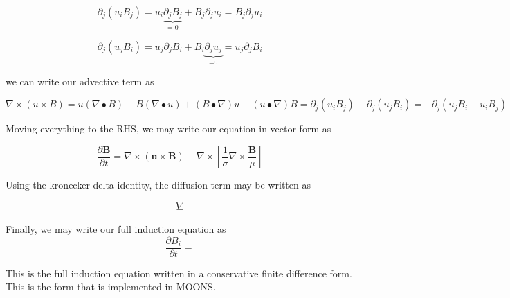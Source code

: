 \begin{equation}
\partial_j (u_i B_j) = 
u_i \underbrace{\partial_j B_j}_\text{= 0} + B_j \partial_j u_i
= B_j \partial_j u_i
\end{equation}

\begin{equation}
\partial_j (u_j B_i) = 
u_j \partial_j B_i + B_i \underbrace{\partial_j u_j}_\text{=0}
= u_j \partial_j B_i
\end{equation}

we can write our advective term as

\begin{equation}
\nabla \times (u \times B) 
= u(\nabla \bullet B) 
- B(\nabla \bullet u)
+ (B \bullet \nabla)u
- (u \bullet \nabla)B
=
\partial_j (u_i B_j) - \partial_j (u_j B_i)
=
-\partial_j (u_j B_i - u_i B_j)
\end{equation}

Moving everything to the RHS, we may write our equation in vector form as

\begin{equation}
\frac{\partial \pmb{B}}{\partial t} = 
\nabla \times (\pmb{u} \times \pmb{B})
- \nabla \times 
\left[ \frac{1}{\sigma}
\nabla \times \frac{\pmb{B}}{\mu} \right]
\end{equation}

Using the kronecker delta identity, the diffusion term may be written as

\begin{equation}
\nabla
\end{equation}
\begin{equation}
=
\end{equation}

Finally, we may write our full induction equation as
\begin{equation}
\frac{\partial B_i}{\partial t} = 
\end{equation}

This is the full induction equation written in a conservative finite difference form. This is the form that is implemented in MOONS.


